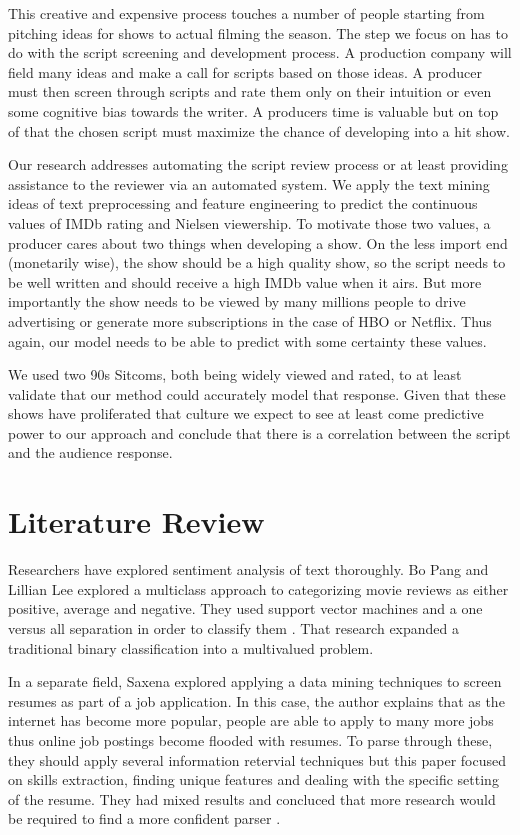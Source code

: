\documentclass{sig-alternate-05-2015}
\begin{document}
This creative and expensive process touches a number of people starting from pitching ideas for shows to actual filming the season. The step we focus on has to do with the script screening and development process. A production company will field many ideas and make a call for scripts based on those ideas. A producer must then screen through scripts and rate them only on their intuition or even some cognitive bias towards the writer. A producers time is valuable but on top of that the chosen script must maximize the chance of developing into a hit show.  

Our research addresses automating the script review process or at least providing assistance to the reviewer via an automated system. We apply the text mining ideas of text preprocessing and feature engineering to predict the continuous values of IMDb rating and Nielsen viewership. To motivate those two values, a producer cares about two things when developing a show. On the less import end (monetarily wise), the show should be a high quality show, so the script needs to be well written and should receive a high IMDb value when it airs. But more importantly the show needs to be viewed by many millions people to drive advertising or generate more subscriptions in the case of HBO or Netflix. Thus again, our model needs to be able to predict with some certainty these values.

We used two 90s Sitcoms, both being widely viewed and rated, to at least validate that our method could accurately model that response. Given that these shows have proliferated that culture we expect to see at least come predictive power to our approach and conclude that there is a correlation between the script and the audience response.

\section{Literature Review} %

Researchers have explored sentiment analysis of text thoroughly. Bo Pang and Lillian Lee explored a multiclass approach to categorizing movie reviews as either positive, average and negative. They used support vector machines and a one versus all separation in order to classify them \cite{Pang:2005:SSE:1219840.1219855}. That research expanded a traditional binary classification into a multivalued problem. 

In a separate field, Saxena explored applying a data mining techniques to screen resumes as part of a job application. In this case, the author explains that as the internet has become more popular, people are able to apply to many more jobs thus online job postings become flooded with resumes. To parse through these, they should apply several information retervial techniques but this paper focused on skills extraction, finding unique features and dealing with the specific setting of the resume. They had mixed results and concluced that more research would be required to find a more confident parser \cite{Charul}.
\end{document}
